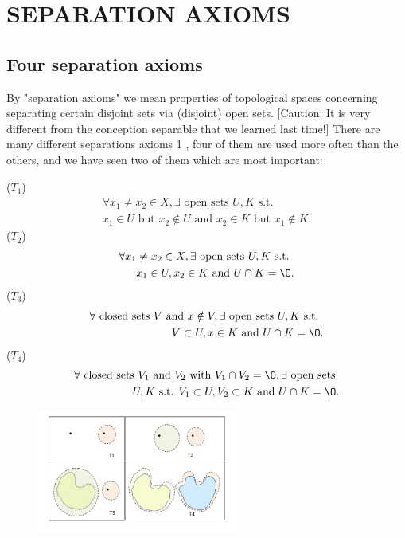 \chapter{SEPARATION AXIOMS}\label{chp:2_1_2}

\section{Four separation axioms}

By "separation axioms" we mean properties of topological spaces concerning separating certain disjoint sets via (disjoint) open sets. [Caution: It is very different from
the conception separable that we learned last time!] There are many different separations axioms 1
, four of them are used more often than the others, and we have seen
two of them which are most important:


\begin{definition}{}{}
    ($T_1$)
    \begin{align*}
        \forall x_1\neq x_2\in X,\exists \text{ open sets }U,K \text{ s.t. }\\
        x_1\in U\text{ but } x_2\notin U \text{ and } x_2\in K\text{ but } x_1\notin K. 
    \end{align*}
    ($T_2$)
    \begin{align*}
        \forall x_1\neq x_2\in X,\exists \text{ open sets } U,K \text{ s.t. }\\
        x_1\in U,x_2\in K \text{ and }U\cap K=\O.
    \end{align*}
    ($T_3$)
    \begin{align*}
        \forall \text{ closed sets }V \text{ and }x\notin V, \exists \text{ open sets } U,K \text{ s.t. }\\
        V\subset U, x\in K \text{ and } U\cap K=\O.
    \end{align*}
    ($T_4$)
    \begin{align*}
        \forall \text{ closed sets } V_1 \text{ and } V_2 \text{ with } V_1\cap V_2=\O, \exists \text{ open sets }\\
        U,K \text{ s.t. } V_1\subset U, V_2\subset K \text{ and }U\cap K=\O.
    \end{align*}
\end{definition}

\begin{figure}[htbp]
    \centering
    \includegraphics[width=0.6\textwidth]{figure/separation/separation_fig.png}
    \caption{}
\end{figure}

